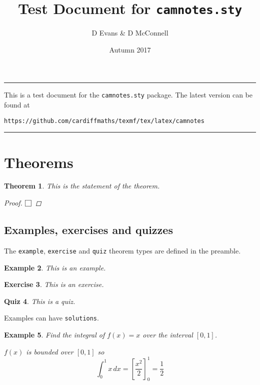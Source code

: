 \documentclass{article}
\title{Test Document for \texttt{camnotes.sty}}
\author{D Evans \& D McConnell}
\date{Autumn 2017}
\theoremstyle{break}
\newcounter{theorem}
\newtheorem{theorem}{Theorem}
\newtheorem{example}[theorem]{Example}
\newtheorem{exercise}[theorem]{Exercise}
\newtheorem{quiz}[theorem]{Quiz}
\newcommand{\qed}{\par\hfill$\bigsquare$\par}
\begin{document}
\maketitle
\tableofcontents
\bigskip
\hrule
\begin{center}
This is a test document for the {\tt camnotes.sty} package. The latest version can be found at
\par
\texttt{https://github.com/cardiffmaths/texmf/tex/latex/camnotes}
\end{center}
\hrule

\section{Theorems}

\begin{theorem}\label{thm:test}
This is the statement of the theorem.
\begin{proof}
\lipsum[1-5]
\qed
\end{proof}
\end{theorem}


\subsection{Examples, exercises and quizzes}
The {\tt example}, {\tt exercise} and {\tt quiz} theorem types are defined in the preamble.

\begin{example}
This is an example.
\end{example}

\begin{exercise}\label{exe:test}
This is an exercise. 
\end{exercise}

\begin{quiz}\label{quiz:test}
This is a quiz. 
\end{quiz}

Examples can have {\tt solutions}.
\begin{example}
Find the integral of $f(x)=x$ over the interval $[0,1]$.
\begin{solution}
$f(x)$ is bounded over $[0,1]$ so 
\[
\int_0^1 x\,dx = \left[\frac{x^2}{2}\right]_0^1 = \frac{1}{2}
\]
\end{solution}
\end{example}
\end{document}

